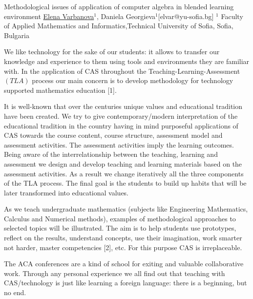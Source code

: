 


\begin{abstract_online}{Methodological issues of application of computer algebra in blended learning environment}{%
        \underline{Elena Varbanova}$^{1}$, Daniela Georgieva$^{1}$}{[elvar@yu-sofia.bg]
        }{%
        $^1$ Faculty of Applied Mathematics and Informatics,Technical University of Sofia, Sofia, Bulgaria }

We like technology for the sake of our students: it allows to transfer our knowledge and experience to them using tools and environments they are familiar with. In the application of CAS throughout the Teaching-Learning-Assessment $(TLA)$ process our main concern is to develop methodology for technology supported mathematics education [1].

It is well-known that over the centuries unique values and educational tradition have been created. We try to give contemporary/modern interpretation of the educational tradition in the country having in mind purposeful applications of CAS towards the course content, course structure, assessment model and assessment activities. The assessment activities imply the learning outcomes. Being aware of the interrelationship between the teaching, learning and assessment we design and develop teaching and learning materials based on the assessment activities. As a result we change iteratively all the three components of the TLA process. The final goal is the students to build up habits that will be later transformed into educational values.

As we teach undergraduate mathematics (subjects like Engineering Mathematics, Calculus and Numerical methods), examples of methodological approaches to selected topics will be illustrated.  The aim is to help students use prototypes, reflect on the results, understand concepts, use their imagination, work smarter not harder, master competencies [2], etc. For this purpose CAS is irreplaceable.

The ACA conferences are a kind of school for exiting and valuable collaborative work. Through any personal experience we all find out that teaching with CAS/technology is just like learning a foreign language: there is a beginning, but no end.


\end{abstract_online}
